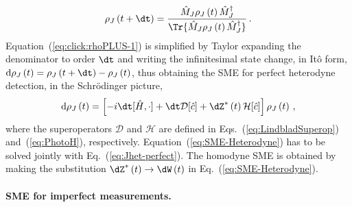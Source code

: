 \begin{equation}
\rho_{J}\left(t+\dt\right)=\frac{\hat{M}_{J}\rho_{J}\left(t\right)\hat{M}_{J}^{\dagger}}{\Tr{\hat{M}_{J}\rho_{J}\left(t\right)\hat{M}_{J}^{\dagger}}}\,.\label{eq:click:rhoPLUS-1}
\end{equation}
Equation~(\ref{eq:click:rhoPLUS-1}) is simplified by Taylor expanding
the denominator to order $\dt$ and writing the infinitesimal state
change, in Itô form, $\mathrm{d}\rho_{J}\left(t\right)=\rho_{J}\left(t+\dt\right)-\rho_{J}\left(t\right)$,
thus obtaining the SME for perfect heterodyne detection, in the Schrödinger
picture,
\begin{equation}
\mathrm{d}\rho_{J}\left(t\right)=\left[-i\dt[\hat{H},\cdot]+\dt\mathcal{D}[\hat{c}]+\dZ^{*}\left(t\right)\mathcal{H}[\hat{c}]\right]\rho_{J}\left(t\right)\,,\label{eq:SME-Heterodyne}
\end{equation}
where the superoperators $\mathcal{D}$ and $\mathcal{H}$ are defined
in Eqs.~(\ref{eq:LindbladSuperop}) and~(\ref{eq:PhotoH}), respectively.
Equation~(\ref{eq:SME-Heterodyne}) has to be solved jointly with
Eq.~(\ref{eq:Jhet-perfect}). The homodyne SME is obtained by making
the substitution $\dZ^{*}\left(t\right)\rightarrow\dW\left(t\right)$
in Eq.~(\ref{eq:SME-Heterodyne}).  

\paragraph{SME for imperfect measurements.}

